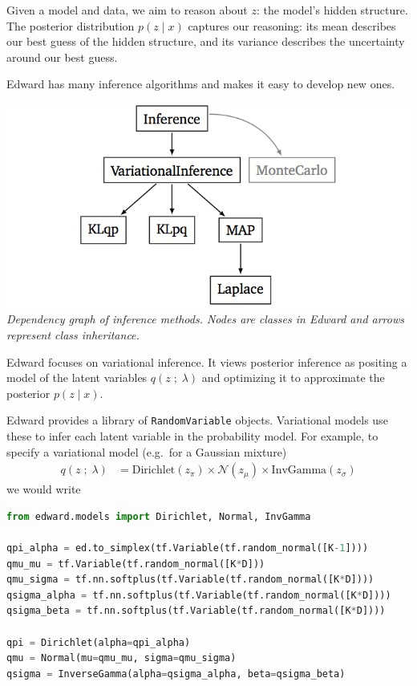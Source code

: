Given a model and data, we aim to
reason about $z$: the model's hidden structure. The
posterior distribution $p(z \mid x)$ captures our reasoning: its mean
describes our best guess of the hidden structure, and its variance
describes the uncertainty around our best guess.

Edward has many inference algorithms and makes it easy
to develop new ones.

\includegraphics{images/inference_structure.png}
{\small\textit{Dependency graph of inference methods.
Nodes are classes in Edward and arrows represent class inheritance.}}

Edward focuses on variational inference. It views posterior inference
as positing a model of the latent variables $q(z \;;\; \lambda)$ and optimizing it to
approximate the posterior $p(z \mid x)$.


Edward provides a library of
\texttt{RandomVariable} objects. Variational models use these to infer
each latent variable in the probability model.
For example, to specify a variational model (e.g.~for a Gaussian mixture)
\begin{align*}
  q(z \;;\; \lambda)
  &=
  \text{Dirichlet}(z_\pi)
  \times
  \mathcal{N}(z_\mu)
  \times
  \text{InvGamma}(z_\sigma)
\end{align*}
we would write
\begin{lstlisting}[language=Python]
from edward.models import Dirichlet, Normal, InvGamma

qpi_alpha = ed.to_simplex(tf.Variable(tf.random_normal([K-1])))
qmu_mu = tf.Variable(tf.random_normal([K*D]))
qmu_sigma = tf.nn.softplus(tf.Variable(tf.random_normal([K*D])))
qsigma_alpha = tf.nn.softplus(tf.Variable(tf.random_normal([K*D])))
qsigma_beta = tf.nn.softplus(tf.Variable(tf.random_normal([K*D])))

qpi = Dirichlet(alpha=qpi_alpha)
qmu = Normal(mu=qmu_mu, sigma=qmu_sigma)
qsigma = InverseGamma(alpha=qsigma_alpha, beta=qsigma_beta)
\end{lstlisting}

